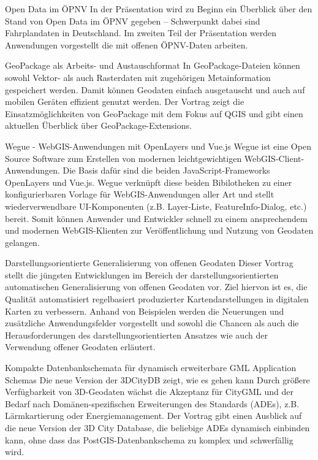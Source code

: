 %
{Open Data im ÖPNV}%
{}%
{%
In der Präsentation wird zu Beginn ein Überblick über den Stand von Open Data im ÖPNV gegeben -- Schwerpunkt dabei sind Fahrplandaten in Deutschland. Im zweiten Teil der Präsentation werden Anwendungen vorgestellt die mit offenen ÖPNV-Daten arbeiten.%
}

%
{GeoPackage als Arbeits- und Austauschformat}%
{}%
{%
In GeoPackage-Dateien können sowohl Vektor- als auch Rasterdaten mit zugehörigen Metainformation gespeichert werden. Damit können Geodaten einfach ausgetauscht und auch auf mobilen Geräten effizient genutzt werden.
Der Vortrag zeigt die Einsatzmöglichkeiten von GeoPackage mit dem Fokus auf QGIS und gibt einen aktuellen Überblick über GeoPackage-Extensions.%
}

%
{Wegue - WebGIS-Anwendungen mit OpenLayers und Vue.js}%
{}%
{%
Wegue ist eine Open Source Software zum Erstellen von modernen leichtgewichtigen WebGIS-Client-Anwendungen. Die Basis dafür sind die beiden JavaScript-Frameworks OpenLayers und Vue.js.
Wegue verknüpft diese beiden Bibilotheken zu einer konfigurierbaren Vorlage für WebGIS-Anwendungen aller Art und stellt wiederverwendbare UI-Komponenten (z.B. Layer-Liste, FeatureInfo-Dialog, etc.) bereit.  Somit können Anwender und Entwickler schnell zu einem ansprechendem und modernen WebGIS-Klienten zur Veröffentlichung und Nutzung von Geodaten gelangen.%
}

%
{Darstellungsorientierte Generalisierung von offenen Geodaten}%
{}%
{%
Dieser Vortrag stellt die jüngsten Entwicklungen im Bereich der darstellungsorientierten automatischen Generalisierung von offenen Geodaten vor.  Ziel hiervon ist es, die Qualität automatisiert regelbasiert produzierter Kartendarstellungen in digitalen Karten zu verbessern.   Anhand von Beispielen werden die Neuerungen und zusätzliche Anwendungsfelder vorgestellt und sowohl die Chancen als auch die Herausforderungen des darstellungsorientierten Ansatzes wie auch der Verwendung offener Geodaten erläutert.%
}

%
{Kompakte Datenbankschemata für dynamisch erweiterbare GML Application Schemas}%
{Die neue Version der 3DCityDB zeigt, wie es gehen kann}%
{%
Durch größere Verfügbarkeit von 3D-Geodaten wächst die Akzeptanz für CityGML und der Bedarf nach Domänen-spezifischen Erweiterungen des Standards (ADEs), z.B. Lärmkartierung oder Energiemanagement. Der Vortrag gibt einen Ausblick auf die neue Version der 3D City Database, die beliebige ADEs dynamisch einbinden kann, ohne dass das PostGIS-Datenbankschema zu komplex und schwerfällig wird.%
}

